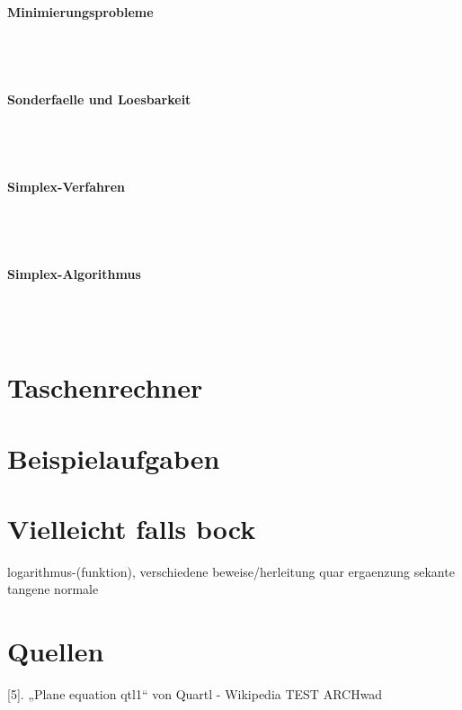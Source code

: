 \documentclass[a4paper]{article} %
\begin{document}
	\paragraph{Minimierungsprobleme}
	 \hspace{0 cm} \\ \noindent \\
	\paragraph{Sonderfaelle und Loesbarkeit}
	 \hspace{0 cm} \\ \noindent \\
	\paragraph{Simplex-Verfahren}
	 \hspace{0 cm} \\ \noindent \\
	\paragraph{Simplex-Algorithmus}
	 \hspace{0 cm} \\ \noindent \\
	\section{Taschenrechner}
	\section{Beispielaufgaben}
	\section{Vielleicht falls bock}
	logarithmus-(funktion), verschiedene beweise/herleitung
	quar ergaenzung sekante tangene normale

	\section{Quellen}
	[5]. „Plane equation qtl1“ von Quartl - Wikipedia
	TEST ARCHwad
\end{document}

